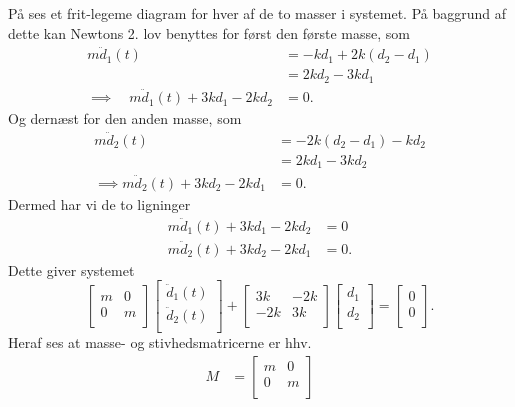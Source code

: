 \begin{derivation}
  På  ses et frit-legeme diagram for hver af de to masser i systemet.
  På baggrund af dette kan Newtons 2. lov benyttes for først den første masse, som
  \begin{align*}
    m \ddot{d}_1(t) &= - kd_1 + 2 k \left( d_2 - d_1 \right) \\
                    &= 2k d_2 - 3k d_1 \\
    \implies \quad m \ddot{d}_1 (t) + 3k d_1 - 2k d_2 &= 0
  .\end{align*}
  Og dernæst for den anden masse, som
  \begin{align*}
    m \ddot{d}_2(t) &= - 2k \left( d_2 - d_1 \right) - k d_2 \\
          &= 2k d_1 - 3k d_2 \\
    \implies m \ddot{d}_2 (t) + 3k d_2 - 2k d_1 &= 0
  .\end{align*}
  Dermed har vi de to ligninger
  \begin{align*}
    m \ddot{d}_1 (t) + 3k d_1 - 2k d_2 &= 0 \\
    m \ddot{d}_2 (t) + 3k d_2 - 2k d_1 &= 0
  .\end{align*}
  Dette giver systemet
  \[ 
  \begin{bmatrix}
  m & 0\\
  0 & m\\
  \end{bmatrix} \begin{bmatrix}
  \ddot{d}_1 (t)\\
  \ddot{d}_2 (t)\\
  \end{bmatrix} + \begin{bmatrix}
  3k & - 2k\\
  -2k  & 3k \\
  \end{bmatrix} \begin{bmatrix}
  d_1\\
  d_2\\
  \end{bmatrix} = \begin{bmatrix}
  0\\
  0\\
  \end{bmatrix}
  .\]
  Heraf ses at masse- og stivhedsmatricerne er hhv.
  \begin{align*}
    M &= \begin{bmatrix}
    m & 0\\
    0 & m\\

\end{bmatrix}
\end{align*}
\end{derivation}
